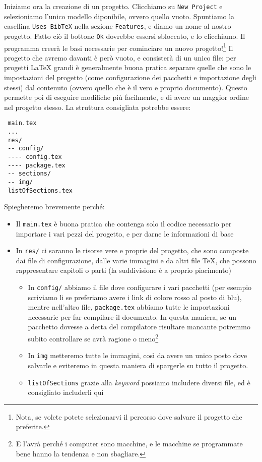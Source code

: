 Iniziamo ora la creazione di un progetto.
Clicchiamo su \texttt{New Project} e selezioniamo l'unico modello diponibile,
ovvero quello vuoto. Spuntiamo la casellina \texttt{Uses BibTeX} nella sezione
\texttt{Features}, e diamo un nome al nostro progetto. Fatto ciò il bottone
\texttt{Ok} dovrebbe essersi sbloccato, e lo clicchiamo. Il programma creerà
le basi necessarie per cominciare un nuovo progetto!\footnote{Nota, se volete
potete selezionarvi il percorso dove salvare il progetto che preferite.}
Il progetto che avremo davanti è però vuoto, e consisterà di un unico file: per 
progetti \LaTeX{} grandi è generalmente buona pratica separare quelle che sono 
le impostazioni del progetto (come configurazione dei pacchetti e importazione 
degli stessi) dal contenuto (ovvero quello che è il vero e proprio documento). 
Questo permette poi di eseguire modifiche più facilmente, e di avere un maggior 
ordine nel progetto stesso.
La struttura consigliata potrebbe essere:
\begin{verbatim}
 main.tex
 ...
 res/
 -- config/
 ---- config.tex
 ---- package.tex
 -- sections/
 -- img/
 listOfSections.tex
\end{verbatim}

Spiegheremo brevemente perché:
\begin{itemize}
  \item Il \texttt{main.tex} è buona pratica che contenga solo il codice 
necessario per importare i vari pezzi del progetto, e per darne le informazioni 
di base
  \item In \texttt{res/} ci saranno le risorse vere e proprie del progetto, che 
sono composte dai file di configurazione, dalle varie immagini e da altri file 
TeX, che possono rappresentare capitoli o parti (la suddivisione è a proprio 
piacimento)
  \begin{itemize}
   \item In \texttt{config/} abbiamo il file dove configurare i vari pacchetti 
(per esempio scriviamo li se preferiamo avere i link di colore rosso al posto 
di blu), mentre nell'altro file, \texttt{package.tex} abbiamo tutte le 
importazioni necessarie per far compilare il documento. In questa maniera, se 
un pacchetto dovesse a detta del compilatore risultare mancante potremmo subito 
controllare se avrà ragione o meno\footnote{E l'avrà perché i computer sono 
macchine, e le macchine se programmate bene hanno la tendenza e non sbagliare.}
  \item In \texttt{img} metteremo tutte le immagini, così da avere un unico 
posto dove salvarle e eviteremo in questa maniera di spargerle su tutto il 
progetto.
  \item \texttt{listOfSections} grazie alla \textit{keyword} \verb!! 
possiamo includere diversi file, ed è consigliato includerli qui %
  \end{itemize}

\end{itemize}
